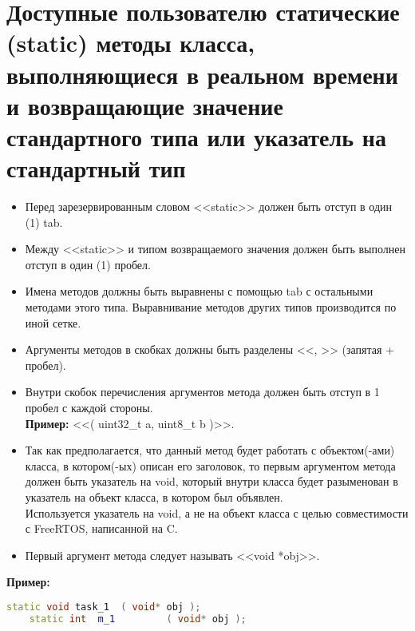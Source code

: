 \section{Доступные пользователю статические (static) методы класса, выполняющиеся в реальном времени и возвращающие значение стандартного типа или указатель на стандартный тип}\label{dp:s:s}	\begin{itemize}
	\item Перед зарезервированным словом <<static>> должен быть отступ в один (1) tab.
	\item Между <<static>> и типом возвращаемого значения должен быть выполнен отступ в один (1) пробел.
	\item Имена методов должны быть выравнены с помощью tab с остальными методами этого типа. Выравнивание методов других типов производится по иной сетке.
	\item Аргументы методов в скобках должны быть разделены <<, >> (запятая + пробел).
	\item Внутри скобок перечисления аргументов метода должен быть отступ в 1 пробел с каждой стороны.\\\textbf{Пример: } <<( uint32\_t a, uint8\_t b )>>.
	\item Так как предполагается, что данный метод будет работать с объектом(-ами) класса, в котором(-ых) описан его заголовок, то первым аргументом метода должен быть указатель на void, который внутри класса будет разыменован в указатель на объект класса, в котором был объявлен.\\Используется указатель на void, а не на объект класса с целью совместимости с FreeRTOS, написанной на C.
	\item Первый аргумент метода следует называть <<void *obj>>.
\end{itemize}
\textbf{Пример:}\begin{lstlisting}[language=C++, frame=tlBR, basicstyle=\fontsize{10}{10}\ttfamily]
	static void	task_1	( void* obj );
	static int	m_1			( void* obj );
\end{lstlisting}

